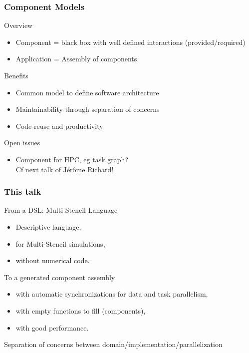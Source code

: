 \documentclass{beamer}
\begin{document}
\begin{frame}
  \frametitle{Component Models} %
  \begin{block}{Overview}
    \begin{itemize}
    \item Component = black box with well defined interactions (provided/required)
    \item Application = Assembly of components
    \end{itemize}
  \end{block}
  \begin{block}{Benefits}
    \begin{itemize}
    \item Common model to define software architecture
    \item Maintainability through separation of concerns
    \item Code-reuse and productivity
    \end{itemize}
  \end{block}
  \begin{alertblock}{Open issues}
    \begin{itemize}
    \item Component for HPC, eg task graph?\\ {\color{red} Cf next talk of Jérôme Richard!}
    \end{itemize}
  \end{alertblock}
\end{frame}
\begin{frame}
\frametitle{This talk}
\begin{block}{From a DSL: Multi Stencil Language}
\begin{itemize}
\item Descriptive language,
\item for Multi-Stencil simulations,
\item without numerical code.
\end{itemize}
\end{block}

\begin{block}{To a generated component assembly}
\begin{itemize}
\item with automatic synchronizations for data and task parallelism,
\item with empty functions to fill (components),
\item with good performance.
\end{itemize}
\end{block}

Separation of concerns between domain/implementation/parallelization

\end{frame}
\end{document}
